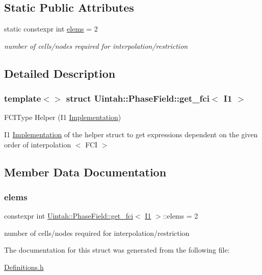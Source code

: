 \subsection*{Static Public Attributes}
\begin{DoxyCompactItemize}
\item 
static constexpr int \hyperlink{structUintah_1_1PhaseField_1_1get__fci_3_01I1_01_4_a5366d92494a12b09cb0f5030d218e418}{elems} = 2
\begin{DoxyCompactList}\small\item\em number of cells/nodes required for interpolation/restriction \end{DoxyCompactList}\end{DoxyCompactItemize}


\subsection{Detailed Description}
\subsubsection*{template$<$$>$\newline
struct Uintah\+::\+Phase\+Field\+::get\+\_\+fci$<$ I1 $>$}

F\+C\+I\+Type Helper (I1 \hyperlink{classUintah_1_1PhaseField_1_1Implementation}{Implementation}) 

I1 \hyperlink{classUintah_1_1PhaseField_1_1Implementation}{Implementation} of the helper struct to get expressions dependent on the given order of interpolation $<$ F\+CI $>$ 

\subsection{Member Data Documentation}
\mbox{\label{structUintah_1_1PhaseField_1_1get__fci_3_01I1_01_4_a5366d92494a12b09cb0f5030d218e418}} 
\subsubsection{\texorpdfstring{elems}{elems}}
{\footnotesize\ttfamily constexpr int \hyperlink{structUintah_1_1PhaseField_1_1get__fci}{Uintah\+::\+Phase\+Field\+::get\+\_\+fci}$<$ \hyperlink{namespaceUintah_1_1PhaseField_a547ce3002aa97fbd3ef3192a6eec8406a66f19efe774b0d2b6e5844eb2d83d305}{I1} $>$\+::elems = 2\hspace{0.3cm}{\ttfamily [static]}}



number of cells/nodes required for interpolation/restriction 



The documentation for this struct was generated from the following file\+:\begin{DoxyCompactItemize}
\item 
\hyperlink{Definitions_8h}{Definitions.\+h}\end{DoxyCompactItemize}
